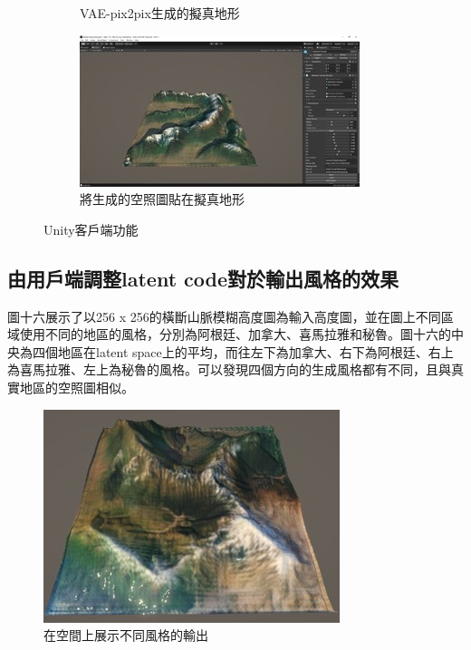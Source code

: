\documentclass[a4paper, 12pt]{article}
\begin{document}
\begin{figure}
\begin{subfigure}[b]{0.475\textwidth}
        \caption[]%
        {{\small VAE-pix2pix生成的擬真地形}}
        \label{fig:15}
    \end{subfigure}
    \hfill
    \begin{subfigure}[b]{0.475\textwidth}
        \centering
        \includegraphics[width=\textwidth]{fig/16.jpg}
        \caption[]%
        {{\small 將生成的空照圖貼在擬真地形}}
        \label{fig:16}
    \end{subfigure}
    \caption[ The average and standard deviation of critical parameters ]
    {\small Unity客戶端功能}
    \label{fig:unity}
\end{figure}

\subsection{由用戶端調整latent code對於輸出風格的效果}
圖十六展示了以256 x 256的橫斷山脈模糊高度圖為輸入高度圖，並在圖上不同區域使用不同的地區的風格，分別為阿根廷、加拿大、喜馬拉雅和秘魯。圖十六的中央為四個地區在latent space上的平均，而往左下為加拿大、右下為阿根廷、右上為喜馬拉雅、左上為秘魯的風格。可以發現四個方向的生成風格都有不同，且與真實地區的空照圖相似。

\begin{figure}[H]
    \centering
    \includegraphics[width=0.7\linewidth]{fig/17.jpg}
    \caption{在空間上展示不同風格的輸出}
    \label{fig:17}
\end{figure}
\end{document}
